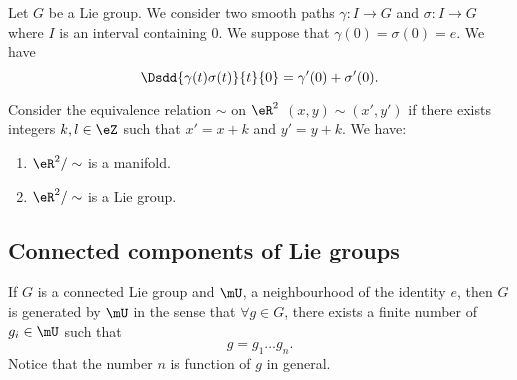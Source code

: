 \begin{proposition}     \label{PROPooAXYRooWVhXRa}
	Let \( G\) be a Lie group. We consider two smooth paths \( \gamma\colon I\to G\) and \( \sigma\colon I\to G\) where \( I\) is an interval containing \( 0\). We suppose that \( \gamma(0)=\sigma(0)=e\). We have
	\begin{equation}
		\Dsdd{ \gamma(t)\sigma(t) }{t}{0}=\gamma'(0)+\sigma'(0).
	\end{equation}
\end{proposition}

\begin{proposition}[\( 2\)-torus]       \label{PROPooSBVCooOZnszF}
	Consider the equivalence relation \( \sim\) on \( \eR^2\) \( (x,y)\sim(x',y')\) if there exists integers \( k,l\in \eZ\) such that \( x'=x+k\) and \( y'=y+k\). We have:
	\begin{enumerate}
		\item
		      \( \eR^2/\sim\) is a manifold.
		\item
		      \( \eR^2/\sim\) is a Lie group.
	\end{enumerate}
\end{proposition}

\subsection{Connected components of Lie groups}

\begin{proposition}		\label{PropUssGpGenere}
	If $G$ is a connected Lie group and $\mU$, a neighbourhood of the identity $e$, then $G$ is generated by $\mU$ in the sense that $\forall g\in G$, there exists a finite number of $g_{i}\in \mU$ such that
	\begin{equation}
		g=g_1\ldots g_n.
	\end{equation}
	Notice that the number $n$ is function of $g$ in general.
\end{proposition}


